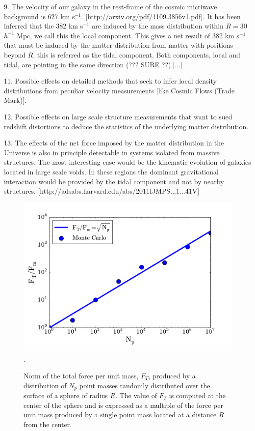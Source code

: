 \documentclass{article}
\begin{document}
9. The velocity of our galaxy in the rest-frame of the cosmic
micriwave background is 627 km
s$^{-1}$. [http://arxiv.org/pdf/1109.3856v1.pdf]. It has been inferred
that the $382$ km s$^{-1}$ are induced by the mass distribution within
$R=30$ $h^{-1}$ Mpc, we call this the local component. This gives a
net result of 382 km s$^{-1}$ that must be induced by the matter
distribution from matter with positions beyond $R$, this is referred
as the tidal component.  Both components, local and tidal, are
pointing in the same direction (??? SURE ??).[...]

11. Possible effects on detailed methods that seek to infer local
density distributions from peculiar velocity measurements [like Cosmic
  Flows (Trade Mark)].

12. Possible effects on large scale structure measurements that want
to sued redshift distortions to deduce the statistics of the
underlying matter distribution. 

13. The effects of the net force imposed by the matter distribution
in the Universe is also in principle detectable in systems isolated 
from massive structures. The most interesting case would be the
kinematic evolution of galaxies located in large scale voids. In these
regions the dominant gravitational interaction would be provided by
the tidal component and not by nearby
structures. [http://adsabs.harvard.edu/abs/2011IJMPS...1...41V] 











\begin{figure}
\begin{center}
\includegraphics[width=0.8\linewidth,angle=0]{spheres_surface.pdf}
\caption{Norm of the total force per unit mass, $F_{T}$, produced by a
  distribution of $N_p$ point masses randomly distributed over the
  surface of a sphere of radius $R$. The value
  of $F_T$ is  computed at the center of the sphere and is  expressed
  as a multiple  of the force per unit mass produced by a  single
  point mass located  at a distance $R$ from the
  center. \label{fig:sphere_surface}}. 
\end{center}
\end{figure}
\end{document}
